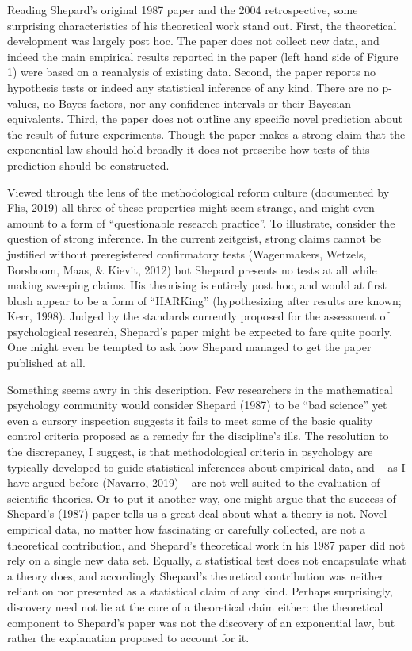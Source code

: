 \documentclass[english,doc]{apa6}
\begin{document}
\noindent
Reading Shepard's original 1987 paper and the 2004 retrospective, some surprising characteristics of his theoretical work stand out. First, the theoretical development was largely post hoc. The paper does not collect new data, and indeed the main empirical results reported in the paper (left hand side of Figure 1) were based on a reanalysis of existing data. Second, the paper reports no hypothesis tests or indeed any statistical inference of any kind. There are no p-values, no Bayes factors, nor any confidence intervals or their Bayesian equivalents. Third, the paper does not outline any specific novel prediction about the result of future experiments. Though the paper makes a strong claim that the exponential law should hold broadly it does not prescribe how tests of this prediction should be constructed.

Viewed through the lens of the methodological reform culture (documented by Flis, 2019) all three of these properties might seem strange, and might even amount to a form of \enquote{questionable research practice}. To illustrate, consider the question of strong inference. In the current zeitgeist, strong claims cannot be justified without preregistered confirmatory tests (Wagenmakers, Wetzels, Borsboom, Maas, \& Kievit, 2012) but Shepard presents no tests at all while making sweeping claims. His theorising is entirely post hoc, and would at first blush appear to be a form of \enquote{HARKing} (hypothesizing after results are known; Kerr, 1998). Judged by the standards currently proposed for the assessment of psychological research, Shepard's paper might be expected to fare quite poorly. One might even be tempted to ask how Shepard managed to get the paper published at all.

Something seems awry in this description. Few researchers in the mathematical psychology community would consider Shepard (1987) to be ``bad science'' yet even a cursory inspection suggests it fails to meet some of the basic quality control criteria proposed as a remedy for the discipline's ills. The resolution to the discrepancy, I suggest, is that methodological criteria in psychology are typically developed to guide statistical inferences about empirical data, and -- as I have argued before (Navarro, 2019) -- are not well suited to the evaluation of scientific theories. Or to put it another way, one might argue that the success of Shepard's (1987) paper tells us a great deal about what a theory is not. Novel empirical data, no matter how fascinating or carefully collected, are not a theoretical contribution, and Shepard's theoretical work in his 1987 paper did not rely on a single new data set. Equally, a statistical test does not encapsulate what a theory does, and accordingly Shepard's theoretical contribution was neither reliant on nor presented as a statistical claim of any kind. Perhaps surprisingly, discovery need not lie at the core of a theoretical claim either: the theoretical component to Shepard's paper was not the discovery of an exponential law, but rather the explanation proposed to account for it.
\end{document}
